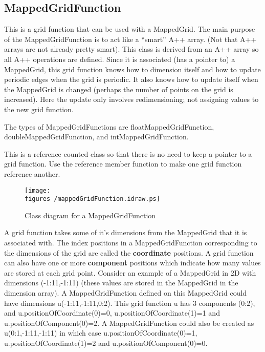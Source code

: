 
\subsection{MappedGridFunction}

This is a grid function that can be used with a MappedGrid.
The main purpose of the {\ff MappedGridFunction} is to act
like a ``smart'' A++ array. (Not that A++ arrays are not already
pretty smart).
This class is derived from an A++ array so all A++ operations
are defined.
Since it is associated (has a pointer to) a {\ff MappedGrid},
this grid function knows how to dimension itself and how
to update periodic edges when the grid is periodic.
It also knows how to update itself when the MappedGrid is
changed (perhaps the number of points on the grid is increased).
Here the update only involves redimensioning; not assigning
values to the new grid function.

The types of MappedGridFunctions are 
{\ff floatMappedGridFunction},
{\ff doubleMappedGridFunction},
 and {\ff int\-Mapped\-Grid\-Function}.

This is a reference counted class so that there is no need
to keep a pointer to a grid function. Use the {\ff reference}
member function to make one grid function reference another.


\begin{figure} \label{fig:MappedGridFunction}
  \begin{center}
  \texttt{[image: \\figures /mappedGridFunction.idraw.ps]}
  \caption{Class diagram for a MappedGridFunction}
  \end{center}
\end{figure}

A grid function takes some of it's dimensions from the MappedGrid that
it is associated with. The index positions in a MappedGridFunction
corresponding to the dimensions
of the grid are called the {\bf coordinate} positions. A grid function 
can also have one or more {\bf component} positions which indicate
how many values are stored at each grid point.
Consider an example of a MappedGrid in 2D with dimensions {\ff(-1:11,-1:11)}
(these values are stored in the MappedGrid in the {\ff dimension} array).
A MappedGridFunction defined on this MappedGrid could have dimensions
{\ff u(-1:11,-1:11,0:2)}. This grid function {\ff u} has 3 components {\ff (0:2)},
and 
{\ff u.positionOfCoordinate(0)=0}, {\ff u.positionOfCoordinate(1)=1} and
{\ff u.positionOfComponent(0)=2}. 
A MappedGridFunction could also be created as {\ff u(0:1,-1:11,-1:11)} in
which case
{\ff u.positionOfCoordinate(0)=1}, {\ff u.positionOfCoordinate(1)=2} and
{\ff u.positionOfComponent(0)=0}.

